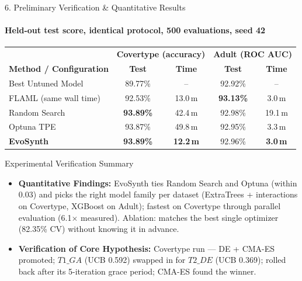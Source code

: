 \documentclass[aspectratio=169, 11pt]{beamer}
\begin{document}
\begin{frame}{6. Preliminary Verification \& Quantitative Results}
    \framesubtitle{Held-out test score, identical protocol, 500 evaluations, seed 42}
    \begin{table}
        \centering
        \scriptsize
        \renewcommand{\arraystretch}{1.15}
        \begin{tabular}{p{4.0cm} c c c c}
            \toprule
             & \multicolumn{2}{c}{\textbf{Covertype (accuracy)}} & \multicolumn{2}{c}{\textbf{Adult (ROC AUC)}} \\
            \textbf{Method / Configuration} & \textbf{Test} & \textbf{Time} & \textbf{Test} & \textbf{Time} \\
            \midrule
            Best Untuned Model & 89.77\% & -- & 92.92\% & -- \\
            FLAML (same wall time) & 92.53\% & 13.0\,m & \textbf{93.13\%} & 3.0\,m \\
            Random Search & \textbf{93.89\%} & 42.4\,m & 92.98\% & 19.1\,m \\
            Optuna TPE & 93.87\% & 49.8\,m & 92.95\% & 3.3\,m \\
            \midrule
            \textbf{EvoSynth} & \textbf{93.89\%} & \textbf{12.2\,m} & 92.96\% & \textbf{3.0\,m} \\
            \bottomrule
        \end{tabular}
    \end{table}
    \vspace{-0.15cm}

    \begin{block}{Experimental Verification Summary}
        \scriptsize
        \begin{itemize}
            \setlength{\itemsep}{1.5pt}
            \item \textbf{Quantitative Findings:} EvoSynth ties Random Search and Optuna (within 0.03) and picks the right model family per dataset (ExtraTrees + interactions on Covertype, XGBoost on Adult); fastest on Covertype through parallel evaluation (6.1$\times$ measured). Ablation: matches the best single optimizer (82.35\% CV) without knowing it in advance.
            \item \textbf{Verification of Core Hypothesis:} Covertype run --- DE + CMA-ES promoted; $T1\_GA$ (UCB 0.592) swapped in for $T2\_DE$ (UCB 0.369); rolled back after its 5-iteration grace period; CMA-ES found the winner.
        \end{itemize}
    \end{block}
\end{frame}
\end{document}
